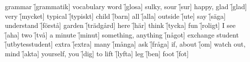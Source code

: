 \begin{questions}
    \begin{multicols}{2}
        \raggedcolumns
        \question grammar \f[grammatik]
        \question vocabulary word \f[glosa]
        \question sulky, sour \f[sur]
        \question happy, glad \f[glad]
        \question very \f[mycket]
        \question typical \f[typiskt]
        \question child \f[barn]
        \question all \f[alla]
        \question outside \f[ute]
        \question say \f[säga]
        \question understand \f[förstå]
        \question garden \f[trädgård]
        \question here \f[här]
        \question think \f[tycka]
        \question fun \f[roligt]
        \question I see \f[aha]
        \question two \f[två]
        \question a minute \f[minut]
        \question something, anything \f[något]
        \question exchange student \f[utbytesstudent]
        \question extra \f[extra]
        \question many \f[många]
        \question ask \f[fråga]
        \question if, about \f[om]
        \question watch out, mind \f[akta]
        \question yourself, you \f[dig]
        \question to lift \f[lyfta]
        \question leg \f[ben]
        \question foot \f[fot]
    \end{multicols}
\end{questions}